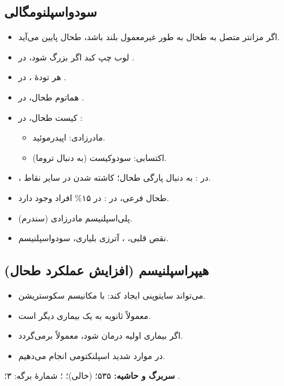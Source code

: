 \documentclass[12pt,a4paper]{article}
\begin{document}
\subsection*{سودواسپلنومگالی}
\begin{itemize}
\item اگر مزانتر متصل به طحال به طور غیرمعمول بلند باشد، طحال پایین می‌آید.
\end{itemize}
\begin{itemize}
\item لوب چپ کبد اگر بزرگ شود، در .
\item هر تودهٔ ، در .
\item هماتوم طحال، در .
\item کیست طحال، در :
  \begin{itemize}
  \item مادرزادی: اپیدرموئید.
  \item اکتسابی: سودوکیست (به دنبال تروما).
  \end{itemize}
\item {}، در : به دنبال پارگی طحال؛ کاشته شدن در سایر نقاط.
\item طحال فرعی، در : در ۱۵\% افراد وجود دارد.
\item پلی‌اسپلنیسم مادرزادی (سندرم).
\item نقص قلبی، ، آترزی بلیاری، سودواسپلنیسم.
\end{itemize}

\subsection*{هیپراسپلنیسم (افزایش عملکرد طحال)}
\begin{itemize}
\item می‌تواند سایتوپنی ایجاد کند: با مکانیسم سکوستریشن.
\item معمولاً ثانویه به یک بیماری دیگر است.
\item اگر بیماری اولیه درمان شود، معمولاً برمی‌گردد.
\item در موارد شدید اسپلنکتومی انجام می‌دهیم.
\end{itemize}

\textbf{سربرگ و حاشیه:} ۵۳۵؛  (خالی)؛ ؛ شمارهٔ برگه: ۳؛ .
\end{document}
